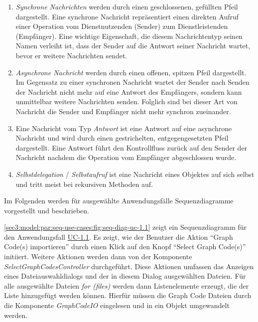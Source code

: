 

\begin{enumerate}[label=(\roman{enumi})]
    \item \textit{Synchrone Nachrichten} werden durch einen geschlossenen, gefüllten Pfeil  dargestellt.
    Eine synchrone Nachricht repräsentiert einen direkten Aufruf einer Operation vom Dienstnutzenden (Sender) zum Dienstleistenden (Empfänger).
    Eine wichtige Eigenschaft, die diesem Nachrichtentyp seinen Namen verleiht ist, dass der Sender auf die Antwort seiner Nachricht wartet, bevor er weitere Nachrichten sendet.
    \item \textit{Asynchrone Nachricht} werden durch einen offenen, spitzen Pfeil  dargestellt.
    Im Gegensatz zu einer synchronen Nachricht wartet der Sender nach Senden der Nachricht nicht mehr auf eine Antwort des Empfängers, sondern kann unmittelbar weitere Nachrichten senden.
    Folglich sind bei dieser Art von Nachricht die Sender und Empfänger nicht mehr synchron zueinander.
    \item Eine Nachricht vom Typ \textit{Antwort} ist eine Antwort auf eine asynchrone Nachricht und wird durch einen gestrichelten, entgegengesetzten Pfeil  dargestellt.
    Eine Antwort führt den Kontrollfluss zurück auf den Sender der Nachricht nachdem die Operation vom Empfänger abgeschlossen wurde.
    \item \textit{Selbstdelegation} / \textit{Selbstaufruf} ist eine Nachricht eines Objektes auf sich selbst und tritt meist bei rekursiven Methoden auf.
\end{enumerate}

Im Folgenden werden für ausgewählte Anwendungsfälle Sequenzdiagramme vorgestellt und beschrieben.



\cref{sec3:model:par:seq-use-cases:fig:seq-diag-uc-1.1} zeigt ein Sequenzdiagramm für den Anwendungsfall \hyperref[sec3:model:uc-1.1]{UC-1.1}.
Es zeigt, wie der Benutzer die Aktion \enquote{Graph Code(s) importieren} durch einen Klick auf den Knopf \enquote{Select Graph Code(s)} initiiert.
Weitere Aktionen werden dann von der Komponente \textit{SelectGraphCodesController} durchgeführt.
Diese Aktionen umfassen das Anzeigen eines Dateiauswahldialogs und der in diesem Dialog ausgewählten Dateien.
Für alle ausgewählte Dateien \textit{for (files)} werden dann Listenelemente erzeugt, die der Liste hinzugefügt werden können.
Hierfür müssen die Graph Code Dateien durch die Komponente \textit{GraphCodeIO} eingelesen und in ein Objekt umgewandelt werden.

